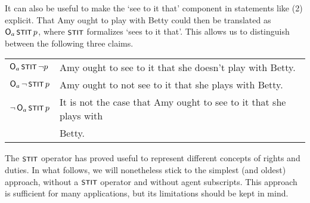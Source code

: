 It can also be useful to make the `see to it that' component in statements like
(2) explicit. That Amy ought to play with Betty could then be translated as
$\Ob_a \stit p$, where $\stit$ formalizes `sees to it that'. This allows us to
distinguish between the following three claims.

\bigskip
\begin{tabular}{ll}
  $\Ob_a \stit \neg p$ & Amy ought to see to it that she doesn't play with Betty.\\
  $\Ob_a \neg \stit p$ & Amy ought to not see to it that she plays with Betty.\\
  $\neg \Ob_a \stit p$ & It is not the case that Amy ought to see to it that she plays with\\[-0.5mm]
                       & Betty.
\end{tabular}
\bigskip



The $\stit$ operator has proved useful to represent different concepts of rights
and duties. In what follows, we will nonetheless stick to the simplest (and
oldest) approach, without a $\stit$ operator and without agent subscripts. This
approach is sufficient for many applications, but its limitations should be kept
in mind.


